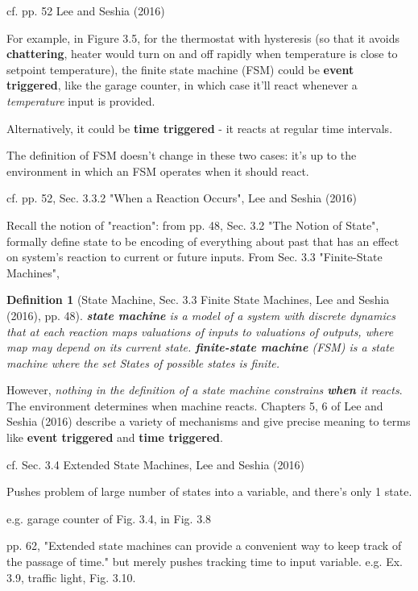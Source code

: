 \documentclass[10pt]{amsart}
\newtheorem{definition}{Definition}
\begin{document}
\begin{multicols*}{2}
cf. pp. 52 Lee and Seshia (2016) \cite{LeSe2016}

For example, in Figure 3.5, for the thermostat with hysteresis (so that it avoids \textbf{chattering}, heater would turn on and off rapidly when temperature is close to setpoint temperature), the finite state machine (FSM) could be \textbf{event triggered}, like the garage counter, in which case it'll react whenever a \emph{temperature} input is provided.

Alternatively, it could be \textbf{time triggered} - it reacts at regular time intervals.

The definition of FSM doesn't change in these two cases: it's up to the environment in which an FSM operates when it should react.

cf. pp. 52, Sec. 3.3.2 "When a Reaction Occurs", Lee and Seshia (2016) \cite{LeSe2016}

Recall the notion of "reaction": from pp. 48, Sec. 3.2 "The Notion of State", formally define state to be encoding of everything about past that has an effect on system's reaction to current or future inputs. From Sec. 3.3 "Finite-State Machines", 
\begin{definition}[State Machine, Sec. 3.3 Finite State Machines, Lee and Seshia (2016)\cite{LeSe2016}, pp. 48]
	\textbf{state machine} is a model of a system with discrete dynamics that at each \emph{reaction} maps valuations of inputs to valuations of outputs, where map may depend on its current state.
	\textbf{finite-state machine} (FSM) is a state machine where the set \emph{States} of possible states is finite.
\end{definition}

However, \emph{nothing in the definition of a state machine constrains \textbf{when} it reacts}. The environment determines when machine reacts. Chapters 5, 6 of Lee and Seshia (2016) \cite{LeSe2016} describe a variety of mechanisms and give precise meaning to terms like \textbf{event triggered} and \textbf{time triggered}.

cf. Sec. 3.4 Extended State Machines, Lee and Seshia (2016) \cite{LeSe2016}

Pushes problem of large number of states into a variable, and there's only 1 state.

e.g. garage counter of Fig. 3.4, in Fig. 3.8

pp. 62, "Extended state machines can provide a convenient way to keep track of the passage of time." but merely pushes tracking time to input variable. e.g. Ex. 3.9, traffic light, Fig. 3.10. \\


\end{multicols*}
\end{document}
